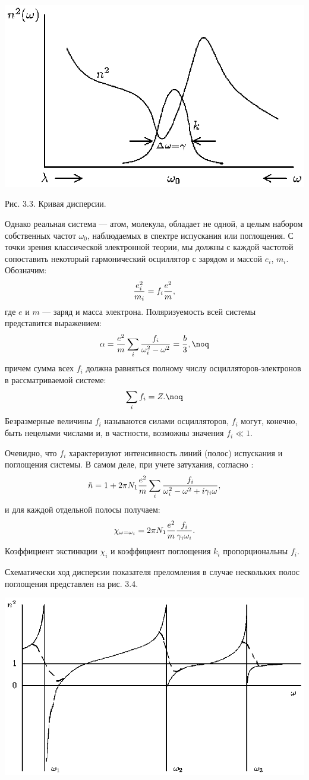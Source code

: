 \vskip 3mm
\centerline{\hbox{\includegraphics[scale=0.7]{Ris/ris_eps/ris3_03.eps}}}

\leftskip 0cm\centerline{\ris Рис. 3.3. Кривая дисперсии.} \vskip
2mm Однако реальная система --- атом, молекула, обладает не одной,
а целым набором собственных частот $\omega_0$, наблюдаемых в
спектре испускания или поглощения. С точки зрения классической
электронной теории, мы должны с каждой частотой сопоставить
некоторый гармонический осциллятор с зарядом и массой $e_i$,
$m_i$. Обозначим:
$${e_i^2\over m_i}=f_i{e^2\over m},$$
где $e$ и $m$ --- заряд и масса электрона. Поляризуемость всей
системы представится выражением:
$$\alpha={e^2\over m}\sum_{i}{f_i\over \omega_i^2-\omega^2}={b\over3},\noq$$
причем сумма всех $f_i$ должна равняться полному числу
осцилляторов-электронов в рассматриваемой системе:
$$\sum_{i}f_i=Z.\noq$$
Безразмерные величины $f_i$ называются силами осцилляторов, $f_i$
могут, конечно, быть нецелыми числами и, в частности, возможны
значения $f_i\ll 1$.

Очевидно, что $f_i$ характеризуют интенсивность линий (полос)
испускания и поглощения системы. В самом деле, при учете
затухания, согласно :
$$\tilde n=1+2\pi N_1{e^2\over m}\sum_{i}{f_i\over
\omega_i^2-\omega^2+i\gamma_i \omega},$$ и для каждой отдельной
полосы получаем:
$$\chi_{\omega=\omega_i}=2\pi N_1{e^2\over m}{f_i\over\gamma_i\omega_i}.$$
Коэффициент экстинкции $\chi_i$ и коэффициент поглощения $k_i$
пропорциональны $f_i$.

Схематически ход дисперсии показателя преломления в случае
нескольких полос поглощения представлен на рис. 3.4.

\vskip 3mm
\centerline{\hbox{\includegraphics[scale=0.7]{Ris/ris_eps/ris3_04.eps}}}

